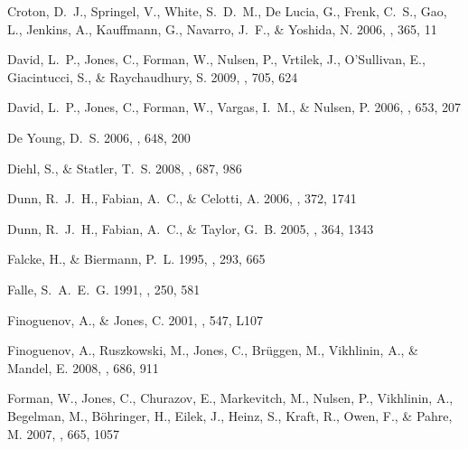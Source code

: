 \documentclass[12pt, preprint]{aastex}
\begin{document}
\begin{thebibliography}{68}
{Croton}, D.~J., {Springel}, V., {White}, S.~D.~M., {De Lucia}, G., {Frenk},
  C.~S., {Gao}, L., {Jenkins}, A., {Kauffmann}, G., {Navarro}, J.~F., \&
  {Yoshida}, N. 2006, \mnras, 365, 11

{David}, L.~P., {Jones}, C., {Forman}, W., {Nulsen}, P., {Vrtilek}, J.,
  {O'Sullivan}, E., {Giacintucci}, S., \& {Raychaudhury}, S. 2009, \apj, 705,
  624

{David}, L.~P., {Jones}, C., {Forman}, W., {Vargas}, I.~M., \& {Nulsen}, P.
  2006, \apj, 653, 207

{De Young}, D.~S. 2006, \apj, 648, 200

{Diehl}, S., \& {Statler}, T.~S. 2008, \apj, 687, 986

{Dunn}, R.~J.~H., {Fabian}, A.~C., \& {Celotti}, A. 2006, \mnras, 372, 1741

{Dunn}, R.~J.~H., {Fabian}, A.~C., \& {Taylor}, G.~B. 2005, \mnras, 364, 1343

{Falcke}, H., \& {Biermann}, P.~L. 1995, \aap, 293, 665

{Falle}, S.~A.~E.~G. 1991, \mnras, 250, 581

{Finoguenov}, A., \& {Jones}, C. 2001, \apjl, 547, L107

{Finoguenov}, A., {Ruszkowski}, M., {Jones}, C., {Br{\"u}ggen}, M.,
  {Vikhlinin}, A., \& {Mandel}, E. 2008, \apj, 686, 911

{Forman}, W., {Jones}, C., {Churazov}, E., {Markevitch}, M., {Nulsen}, P.,
  {Vikhlinin}, A., {Begelman}, M., {B{\"o}hringer}, H., {Eilek}, J., {Heinz},
  S., {Kraft}, R., {Owen}, F., \& {Pahre}, M. 2007, \apj, 665, 1057


\end{thebibliography}
\end{document}
